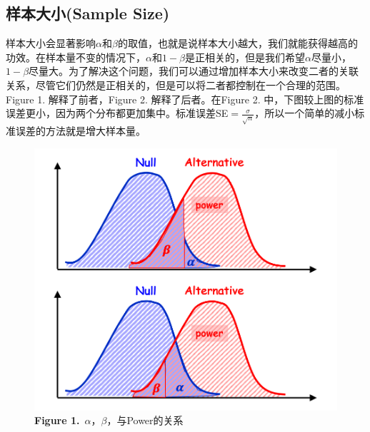 \documentclass[UTF8]{ctexbook}
\begin{document}
\subsection{样本大小(Sample Size)}
样本大小会显著影响$\alpha$和$\beta$的取值，也就是说样本大小越大，我们就能获得越高的功效。在样本量不变的情况下，$\alpha$和$1-\beta$是正相关的，但是我们希望$\alpha$尽量小，$1-\beta$尽量大。为了解决这个问题，我们可以通过增加样本大小来改变二者的关联关系，尽管它们仍然是正相关的，但是可以将二者都控制在一个合理的范围。Figure 1. 解释了前者，Figure 2. 解释了后者。在Figure 2. 中，下图较上图的标准误差更小，因为两个分布都更加集中。标准误差SE$=\displaystyle\frac{\sigma}{\sqrt{n}}$，所以一个简单的减小标准误差的方法就是增大样本量。

\begin{figure}[h]
    \centering
    \begin{minipage}{0.45\textwidth}
        \centering
        \includegraphics[width = \textwidth]{Figure 1.png} %
        \caption{\textbf{Figure 1.}\ $\alpha$，$\beta$，与Power的关系}
    \end{minipage}
    \hfill
    \begin{minipage}{0.45\textwidth}
        \centering

\end{minipage}
\end{figure}
\end{document}
